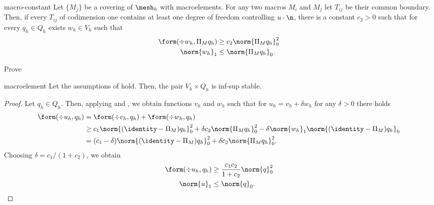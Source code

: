 \begin{Lemma}{macro-constant}
  Let $\{M_j\}$ be a covering of $\mesh_h$ with macroelements. For any
  two macros $M_i$ and $M_j$ let $T_{ij}$ be their common
  boundary. Then, if every $T_{ij}$ of codimension one contains at
  least one degree of freedom controlling $u\cdot\n$, there is a
  constant $c_2>0$ such that for every $q_h\in Q_h$ exists $w_h\in
  V_h$ such that
  \begin{gather}
    \label{eq:macroelement:33}
    \begin{split}
      \form(\div w_h, \Pi_M q_h) &\ge c_2 \norm{\Pi_M q_h}^2_0\\
      \norm{w_h}_1 &\le \norm{\Pi_M q_h}_0.
    \end{split}
  \end{gather}
\end{Lemma}

\begin{Problem}
  Prove 
\end{Problem}

\begin{Theorem}{macroelement}
  Let the assumptions of 
  hold. Then, the pair $V_h\times Q_h$ is inf-sup stable.
\end{Theorem}

\begin{proof}
  Let $q_h\in Q_h$. Then, applying 
  and , we obtain functions $v_h$ and
  $w_h$ such that for $u_h = v_h+ \delta w_h$ for any $\delta>0$ there
  holds
  \begin{align}
    \form(\div u_h, q_h)
    &= \form(\div v_h, q_h) + \form(\div w_h, q_h) \\
    &\ge c_1 \norm{(\identity-\Pi_M) q_h}_0^2
      + \delta c_2 \norm{\Pi_M q_h}_0^2
      - \delta \norm{w_h}_1 \norm{(\identity-\Pi_M) q_h}_0 \\
    & = (c_1 - \delta) \norm{(\identity-\Pi_M) q_h}_0^2
      + \delta c_2 \norm{\Pi_M q_h}_0^2.
  \end{align}
  Choosing $\delta = c_1/(1+c_2)$, we obtain
  \begin{gather}
    \label{eq:macroelement:34}
    \begin{split}
      \form(\div u_h, q_h) &\ge \frac{c_1c_2}{1+c_2} \norm{q}_0^2 \\
      \norm{u}_1 &\le \norm{q}_0.
    \end{split}
  \end{gather}
\end{proof}


